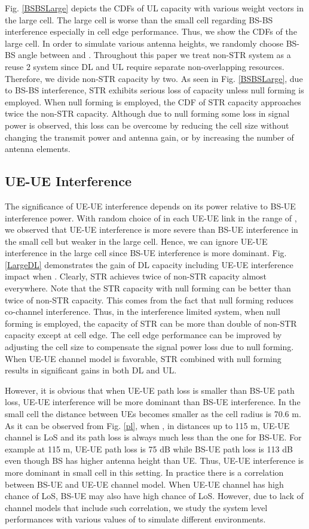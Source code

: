 \documentclass[twocolumn]{IEEEtran}
\begin{document}
Fig. \ref{BSBSLarge} depicts the CDFs of UL capacity with various
weight vectors in the large cell. The large cell is worse than the
small cell regarding BS-BS interference especially in cell edge
performance. Thus, we show the CDFs of the large cell. In order to
simulate various antenna heights, we randomly choose BS-BS angle
between  and . Throughout this paper we treat
non-STR system as a reuse 2 system since DL and UL require separate
non-overlapping resources. Therefore, we divide non-STR capacity by
two. As seen in Fig. \ref{BSBSLarge}, due to BS-BS interference, STR
exhibits serious loss of capacity unless null forming is employed.
When null forming is employed, the CDF of STR capacity approaches
twice the non-STR capacity. Although due to null forming some loss
in signal power is observed, this loss can be overcome by reducing
the cell size without changing the transmit power and antenna gain,
or by increasing the number of antenna elements.


\subsection{UE-UE Interference}

The significance of UE-UE interference depends on its power relative
to BS-UE interference power. With random choice of  in each UE-UE
link in the range of , we observed that UE-UE
interference is more severe than BS-UE interference in the small
cell but weaker in the large cell. Hence, we can ignore UE-UE
interference in the large cell since BS-UE interference is more
dominant. Fig. \ref{LargeDL} demonstrates the gain of DL capacity
including UE-UE interference impact when . Clearly, STR
achieves twice of non-STR capacity almost everywhere. Note that the
STR capacity with null forming can be better than twice of non-STR
capacity. This comes from the fact that null forming reduces
co-channel interference. Thus, in the interference limited system,
when null forming is employed, the capacity of STR can be more than
double of non-STR capacity except at cell edge. The cell edge
performance can be improved by adjusting the cell size to compensate
the signal power loss due to null forming. When UE-UE channel model
is favorable, STR combined with null forming results in significant
gains in both DL and UL.

However, it is obvious that when UE-UE path loss is smaller than
BS-UE path loss, UE-UE interference will be more dominant than BS-UE
interference. In the small cell the distance between UEs becomes
smaller as the cell radius is 70.6 m. As it can be observed from
Fig. \ref{pl}, when , in distances up to 115 m, UE-UE
channel is LoS and its path loss is always much less than the one
for BS-UE. For example at 115 m, UE-UE path loss is 75 dB while
BS-UE path loss is 113 dB even though BS has higher antenna height
than  UE. Thus, UE-UE interference is more dominant in small cell in
this setting. In practice there is a correlation between BS-UE and
UE-UE channel model. When UE-UE channel has high chance of LoS,
BS-UE may also have high chance of LoS. However, due to lack of
channel models that include such correlation, we study the system
level performances with various values of  to simulate different
environments.
\end{document}
